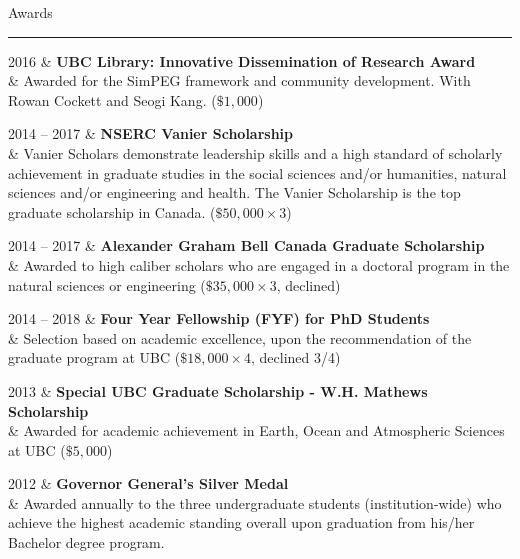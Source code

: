 \documentclass[a4paper, 11pt]{article}
\newcommand{\heading}[1]{
    \begin{minipage}[t]{\textwidth}
    \vspace{0.45cm}
    {\LARGE #1}\\
    \vspace{-0.2cm}
    \hrule
    \end{minipage}
    \vspace{0.2cm}

}
\begin{document}

\heading{Awards}

\begin{entryright}
2016 & \textbf{UBC Library: Innovative Dissemination of Research Award}   \\
& Awarded for the SimPEG framework and community development. With Rowan Cockett and Seogi Kang. ($\$1,000$)
\end{entryright}

\begin{entryright}
2014 -- 2017 & \textbf{NSERC Vanier Scholarship} \\
& Vanier Scholars demonstrate leadership skills and a high standard of scholarly achievement in graduate studies in the social sciences and/or humanities, natural sciences and/or engineering and health. The Vanier Scholarship is the top graduate scholarship in Canada. ($ \$50,000 \times 3$)
\end{entryright}

\begin{entryright}
2014 -- 2017 & \textbf{Alexander Graham Bell Canada Graduate Scholarship} \\
& Awarded to high caliber scholars who are engaged in a doctoral program in the natural sciences or engineering ($ \$35,000 \times 3$, declined)
\end{entryright}

\begin{entryright}
2014 -- 2018 & \textbf{Four Year Fellowship (FYF) for PhD Students} \\
& Selection based on academic excellence, upon the recommendation of the graduate program at UBC ($\$18,000 \times 4$, declined 3/4)
\end{entryright}

\begin{entryright}
2013 & \textbf{Special UBC Graduate Scholarship - W.H. Mathews Scholarship} \\
& Awarded for academic achievement in Earth, Ocean and Atmospheric Sciences at UBC ($\$5,000$)
\end{entryright}

\begin{entryright}
2012 & \textbf{Governor General’s Silver Medal} \\
& Awarded annually to the three undergraduate students (institution-wide) who achieve the highest academic standing overall upon graduation from his/her Bachelor degree program.
\end{entryright}
\end{document}
